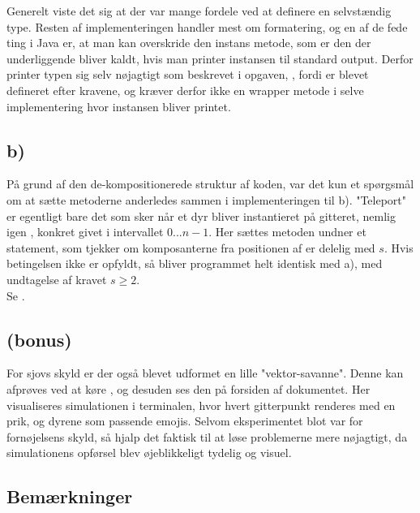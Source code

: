 Generelt viste det sig at der var mange fordele ved at definere en selvstændig  type. Resten af implementeringen handler mest om formatering, og en af de fede ting i Java er, at man kan overskride den  instans metode, som er den der underliggende bliver kaldt, hvis man printer instansen til standard output. Derfor printer  typen sig selv nøjagtigt som beskrevet i opgaven, \code{[x;y]}, fordi  er blevet defineret efter kravene, og kræver derfor ikke en wrapper metode i selve implementering hvor instansen bliver printet.

\subsection*{b)}

På grund af den de-kompositionerede struktur af koden, var det kun et spørgsmål om at sætte metoderne anderledes sammen i implementeringen til b). "Teleport" er egentligt bare det som sker når et dyr bliver instantieret på gitteret, nemlig igen , konkret givet i intervallet \(0 ... n - 1\). Her sættes metoden undner et  statement, som tjekker om komposanterne fra positionen af  er delelig med \(s\). Hvis betingelsen ikke er opfyldt, så bliver programmet helt identisk med a), med undtagelse af kravet \(s \geq 2\). \\[5pt]

Se .

\pagebreak

\subsection*{(bonus)}

For sjovs skyld er der også blevet udformet en lille "vektor-savanne". Denne kan afprøves ved at køre , og desuden ses den på forsiden af dokumentet. Her visualiseres simulationen i terminalen, hvor hvert gitterpunkt renderes med en prik, og dyrene som passende emojis. Selvom eksperimentet blot var for fornøjelsens skyld, så hjalp det faktisk til at løse problemerne mere nøjagtigt, da simulationens opførsel blev øjeblikkeligt tydelig og visuel. \\[20pt]

\subsection*{Bemærkninger}

